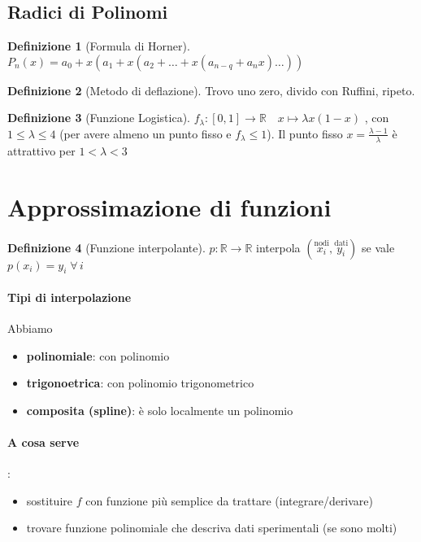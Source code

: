 \documentclass[a4paper,10pt]{article}
\theoremstyle{definition}
\theoremstyle{indentdefinition}
\newtheorem{defn}{Definizione}[section]
\theoremstyle{indenttheorem}
\theoremstyle{myremark}
\theoremstyle{indentgeneral}
\theoremstyle{plain}
\theoremstyle{plain}
\begin{document}
\subsection{Radici di Polinomi}
\begin{defn}[Formula di Horner]
$P_{n}\left(x\right)=a_{0}+x\left(a_{1}+x\left(a_{2}+\ldots+x\left(a_{n-q}+a_{n}x\right)\ldots\right)\right)$
\end{defn}

\begin{defn}[Metodo di deflazione]
Trovo uno zero, divido con Ruffini, ripeto.
\end{defn}

\begin{defn}[Funzione Logistica]
$f_{\lambda}\colon\left[0,1\right]\rightarrow\mathbb{R}\quad x\mapsto\lambda x\left(1-x\right)$
, con $1\leq\lambda\leq4$ (per avere almeno un punto fisso e $f_{\lambda}\leq1$).
Il punto fisso $x=\frac{\lambda-1}{\lambda}$ è attrattivo per $1<\lambda<3$
\end{defn}


\pagebreak{}

\section{Approssimazione di funzioni}
\begin{defn}[Funzione interpolante]
$p\colon\mathbb{R}\rightarrow\mathbb{R}$ interpola $\left(\overset{\text{nodi}}{x_{i}},\overset{\text{dati}}{y_{i}}\right)$
se vale $p\left(x_{i}\right)=y_{i}\;\forall\,i$
\end{defn}
\paragraph{Tipi di interpolazione}Abbiamo
\begin{itemize}
    \item \textbf{polinomiale}: con polinomio
    \item \textbf{trigonoetrica}: con polinomio trigonometrico
    \item \textbf{composita (spline)}: è solo localmente un polinomio
\end{itemize}

\paragraph{A cosa serve}:
\begin{itemize}
    \item sostituire $f$ con funzione più semplice da trattare (integrare/derivare)
    \item trovare funzione polinomiale che descriva dati sperimentali (se sono molti)
\end{itemize}
\end{document}
